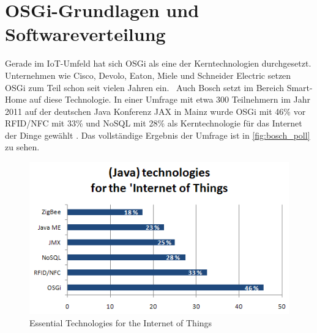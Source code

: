 \chapter{OSGi-Grundlagen und Softwareverteilung}


Gerade im \ac{IoT}-Umfeld hat sich \ac{OSGi} als eine der Kerntechnologien durchgesetzt.
\glqq Unternehmen wie Cisco, Devolo, Eaton, Miele und Schneider Electric setzen \ac{OSGi} zum Teil schon seit vielen Jahren ein.\grqq\ \cite{osgi_iot_und_mobile}
Auch Bosch setzt im Bereich Smart-Home auf diese Technologie. In einer Umfrage mit etwa 300 Teilnehmern im Jahr 2011 auf der deutschen Java Konferenz JAX in Mainz wurde \ac{OSGi} mit 46\% 
vor RFID/NFC mit 33\% und NoSQL mit 28\% als Kerntechnologie für das Internet der Dinge gewählt \cite{bosch_osgi}. Das vollständige Ergebnis der Umfrage
ist in \autoref{fig:bosch_poll} zu sehen.

\begin{figure}[bh]
 \centering
 \includegraphics[scale=0.55]{content/pictures/bosch_iot_poll.png}
 \caption{Essential Technologies for the Internet of Things \cite{bosch_osgi}}
 \label{fig:bosch_poll}
\end{figure}

